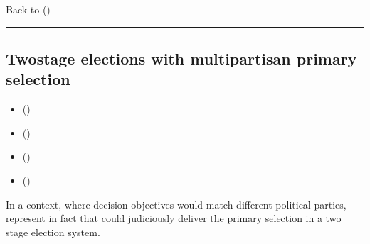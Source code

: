 \documentclass[a4paper,12pt,english]{sphinxhowto}
\begin{document}
\sphinxAtStartPar
Back to {\hyperref[\detokenize{pearls:pearls-label}]{}} ()


\bigskip\hrule\bigskip



\subsection{Two\sphinxhyphen{}stage elections with multipartisan primary selection}
\label{\detokenize{pearls:two-stage-elections-with-multipartisan-primary-selection}}\label{\detokenize{pearls:two-stage-elections-label}}
\begin{sphinxcontents}
\begin{itemize}
\item {} 
\sphinxAtStartPar
{}\label{\detokenize{pearls:id126}}{\hyperref[\detokenize{pearls:converting-voting-profiles-into-performance-tableaux}]{}} ()

\item {} 
\sphinxAtStartPar
{}\label{\detokenize{pearls:id127}}{\hyperref[\detokenize{pearls:multipartisan-primary-selection-of-eligible-candidates}]{}} ()

\item {} 
\sphinxAtStartPar
{}\label{\detokenize{pearls:id128}}{\hyperref[\detokenize{pearls:secondary-election-winner-determination}]{}} ()

\item {} 
\sphinxAtStartPar
{}\label{\detokenize{pearls:id129}}{\hyperref[\detokenize{pearls:multipartisan-preferences-in-divisive-politics}]{}} ()

\end{itemize}
\end{sphinxcontents}

\sphinxAtStartPar
In a  context, where decision objectives would match different political parties,  represent in fact  that could judiciously deliver the primary selection in a two stage election system.
\end{document}

